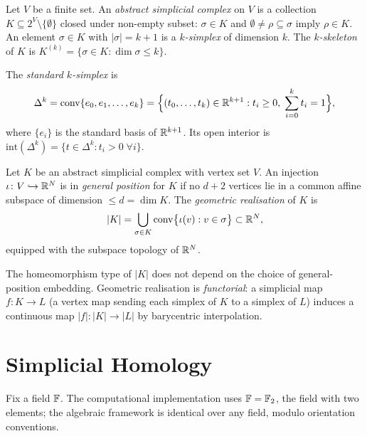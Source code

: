 \begin{definition}
\label{def:simplicial-abstract}
Let $V$ be a finite set. An \emph{abstract simplicial complex} on $V$ is a collection $K\subseteq 2^V\setminus\{\emptyset\}$ closed under non-empty subset: $\sigma\in K$ and $\emptyset\neq\rho\subseteq\sigma$ imply $\rho\in K$. An element $\sigma\in K$ with $|\sigma|=k+1$ is a \emph{$k$-simplex} of dimension $k$. The \emph{$k$-skeleton} of $K$ is $K^{(k)}=\{\sigma\in K:\dim\sigma\leq k\}$.
\end{definition}

\begin{definition}
\label{def:standard-simplex}
The \emph{standard $k$-simplex} is
\[
  \Delta^k=\operatorname{conv}\{e_0,e_1,\ldots,e_k\}
  =\Bigl\{(t_0,\ldots,t_k)\in\mathbb{R}^{k+1}:t_i\geq 0,\;\sum_{i=0}^kt_i=1\Bigr\},
\]
where $\{e_i\}$ is the standard basis of $\mathbb{R}^{k+1}$. Its open interior is $\mathrm{int}(\Delta^k)=\{t\in\Delta^k:t_i>0\;\forall i\}$.
\end{definition}

\begin{definition}
\label{def:geo-real}
Let $K$ be an abstract simplicial complex with vertex set $V$. An injection $\iota\colon V\hookrightarrow\mathbb{R}^N$ is in \emph{general position} for $K$ if no $d+2$ vertices lie in a common affine subspace of dimension $\leq d=\dim K$. The \emph{geometric realisation} of $K$ is
\[
  |K|=\bigcup_{\sigma\in K}\operatorname{conv}\bigl\{\iota(v):v\in\sigma\bigr\}\subset\mathbb{R}^N,
\]
equipped with the subspace topology of $\mathbb{R}^N$.
\end{definition}

The homeomorphism type of $|K|$ does not depend on the choice of general-position embedding. Geometric realisation is \emph{functorial}: a simplicial map $f\colon K\to L$ (a vertex map sending each simplex of $K$ to a simplex of $L$) induces a continuous map $|f|\colon|K|\to|L|$ by barycentric interpolation.

\section{Simplicial Homology}
\label{subsec:homology}

Fix a field $\mathbb{F}$. The computational implementation uses $\mathbb{F}=\mathbb{F}_2$, the field with two elements; the algebraic framework is identical over any field, modulo orientation conventions.

